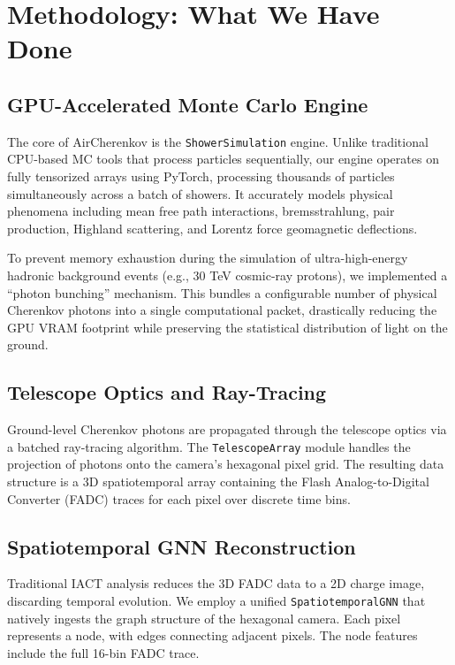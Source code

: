 \documentclass[twocolumn,times]{aastex631}
\begin{document}
\section{Methodology: What We Have Done}

\subsection{GPU-Accelerated Monte Carlo Engine}
The core of AirCherenkov is the \texttt{ShowerSimulation} engine. Unlike traditional CPU-based MC tools that process particles sequentially, our engine operates on fully tensorized arrays using PyTorch, processing thousands of particles simultaneously across a batch of showers. It accurately models physical phenomena including mean free path interactions, bremsstrahlung, pair production, Highland scattering, and Lorentz force geomagnetic deflections. 

To prevent memory exhaustion during the simulation of ultra-high-energy hadronic background events (e.g., 30 TeV cosmic-ray protons), we implemented a ``photon bunching'' mechanism. This bundles a configurable number of physical Cherenkov photons into a single computational packet, drastically reducing the GPU VRAM footprint while preserving the statistical distribution of light on the ground.

\subsection{Telescope Optics and Ray-Tracing}
Ground-level Cherenkov photons are propagated through the telescope optics via a batched ray-tracing algorithm. The \texttt{TelescopeArray} module handles the projection of photons onto the camera's hexagonal pixel grid. The resulting data structure is a 3D spatiotemporal array containing the Flash Analog-to-Digital Converter (FADC) traces for each pixel over discrete time bins.

\subsection{Spatiotemporal GNN Reconstruction}
Traditional IACT analysis reduces the 3D FADC data to a 2D charge image, discarding temporal evolution. We employ a unified \texttt{SpatiotemporalGNN} that natively ingests the graph structure of the hexagonal camera. Each pixel represents a node, with edges connecting adjacent pixels. The node features include the full 16-bin FADC trace. 
\end{document}
